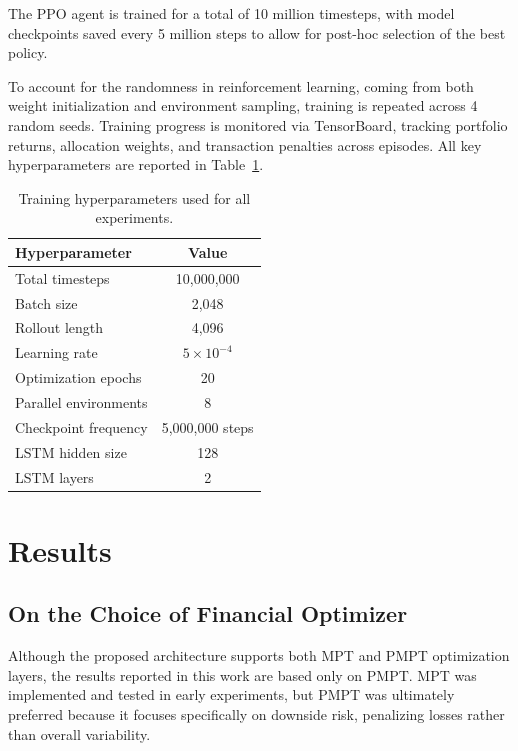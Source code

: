 \documentclass[final]{article}
\begin{document}
The PPO agent is trained for a total of 10 million timesteps, with model checkpoints saved every 5 million steps to
allow for post-hoc selection of the best policy.

To account for the randomness in reinforcement learning, coming from both weight initialization and environment
sampling, training is repeated across 4 random seeds. Training progress is monitored via TensorBoard, tracking
portfolio returns, allocation weights, and transaction penalties across episodes. All key hyperparameters are
reported in Table~\ref{tab:hyperparams}.

\begin{table}[h!]
    \centering
    \caption{Training hyperparameters used for all experiments.}
    \label{tab:hyperparams}
    \begin{tabular}{lc}
        \toprule
        \textbf{Hyperparameter} & \textbf{Value} \\
        \midrule
        Total timesteps         & 10,000,000 \\
        Batch size              & 2,048 \\
        Rollout length          & 4,096 \\
        Learning rate           & $5 \times 10^{-4}$ \\
        Optimization epochs     & 20 \\
        Parallel environments   & 8 \\
        Checkpoint frequency    & 5,000,000 steps \\
        \midrule
        LSTM hidden size        & 128 \\
        LSTM layers             & 2 \\
        \bottomrule
    \end{tabular}
\end{table}

\section{Results}
\label{sec:results}

\subsection{On the Choice of Financial Optimizer}
Although the proposed architecture supports both MPT and PMPT optimization layers, the results reported in this work
are based only on PMPT. MPT was implemented and tested in early experiments, but PMPT was ultimately preferred because
it focuses specifically on downside risk, penalizing losses rather than overall variability.
\end{document}

